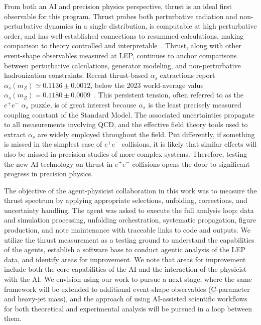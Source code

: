 From both an AI and precision physics perspective, thrust is an ideal first observable for this program.
Thrust probes both perturbative radiation and non-perturbative dynamics in a
single distribution, is computable at high perturbative order, and has well-established
connections to resummed calculations, making comparison to theory controlled and
interpretable~\cite{PhysRevLett.39.1587,Abbate:2010xh,Heister:2003aj}. Thrust, along with other event-shape observables measured at LEP, continues to anchor comparisons between
perturbative calculations, generator modeling, and non-perturbative hadronization
constraints. Recent thrust-based $\alpha_s$ extractions report
$\alpha_s(m_Z)\simeq 0.1136\pm 0.0012$, below the 2023 world-average value
$\alpha_s(m_Z)=0.1180\pm 0.0009$~\cite{Benitez:2024nav,ParticleDataGroup:2022pth}.
This persistent tension, often referred to as the $e^{+}e^{-}$ $\alpha_{s}$ puzzle, is of great interest because $\alpha_{s}$ is the least precisely measured coupling constant of the Standard Model. The associated uncertainties propagate to all measurements involving QCD, and the effective field theory tools used to extract $\alpha_{s}$ are widely employed throughout the field. Put differently, if something is missed in the simplest case of $e^{+}e^{-}$ collisions, it is likely that similar effects will also be missed in precision studies of more complex systems. Therefore, testing the new AI technology on thrust in $e^+e^-$ collisions opens the door to significant progress in precision physics.

The objective of the agent-physicist collaboration in this work was to measure the thrust spectrum by applying appropriate selections, unfolding, corrections, and uncertainty handling. The agent was asked to execute the full analysis loop: data and simulation processing, unfolding orchestration,
systematic propagation, figure production, and note maintenance with traceable links
to code and outputs. We utilize the thrust measurement as a testing ground to understand the capabilities of the agents, establish a software base to conduct agentic analysis of the LEP data, and identify areas for improvement. We note that areas for improvement include both the core capabilities of the AI and the interaction of the physicist with the AI.
We envision using our work to pursue a next stage, where the same framework
will be extended to additional event-shape observables (C-parameter and heavy-jet
mass), and the approach of using AI-assisted scientific workflows for both theoretical
and experimental analysis will be pursued in a loop between them. 

